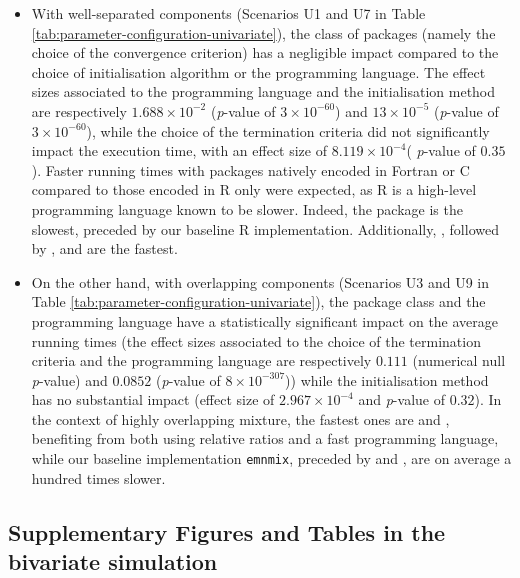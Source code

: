 \begin{itemize}
\item
  With well-separated components (Scenarios U1
  and U7 in Table \ref{tab:parameter-configuration-univariate}), the class
  of packages (namely the choice of the convergence criterion) has a negligible impact compared to the choice of initialisation algorithm or the programming language. The effect sizes associated to the programming language and the initialisation method are respectively \(1.688 \times 10^{-2}\) (\emph{p}-value of \(3 \times 10^{-60}\)) and \(13 \times 10^{-5}\) (\emph{p}-value of
  \(3 \times 10^{-60}\)), while the choice of the termination criteria did
  not significantly impact the execution time, with an effect size of
  \(8.119 \times 10^{-4}\)( \emph{p}-value of \(0.35\)). Faster running times with
  packages natively encoded in Fortran or C compared to those encoded in R
  only were expected, as R is a high-level programming language known to
  be slower. Indeed, the  package is the slowest, preceded by
  our baseline R implementation. Additionally,
  , followed by ,  and 
  are the fastest.
\item
  On the other hand, with overlapping components (Scenarios U3 and U9 in Table \ref{tab:parameter-configuration-univariate}), the package class and the programming language have a statistically significant impact on the average running times (the effect sizes associated to the
  choice of the termination criteria and the programming language are
  respectively \(0.111\) (numerical null \emph{p}-value) and \(0.0852\) (\emph{p}-value of
  \(8 \times 10^{-307}\))) while the initialisation method has no substantial impact (effect size of
  \(2.967 \times 10^{-4}\) and \emph{p}-value of \(0.32\)). In the context of highly overlapping mixture, the fastest ones are  and , benefiting from both using
  relative ratios and a fast programming language, while our
  baseline implementation \texttt{emnmix}, preceded by  and , are on average a hundred times slower.
\end{itemize}

\newpage

\hypertarget{supplementary-figures-and-tables-in-the-bivariate-simulation}{%
\subsection{Supplementary Figures and Tables in the bivariate simulation}\label{supplementary-figures-and-tables-in-the-bivariate-simulation}}

